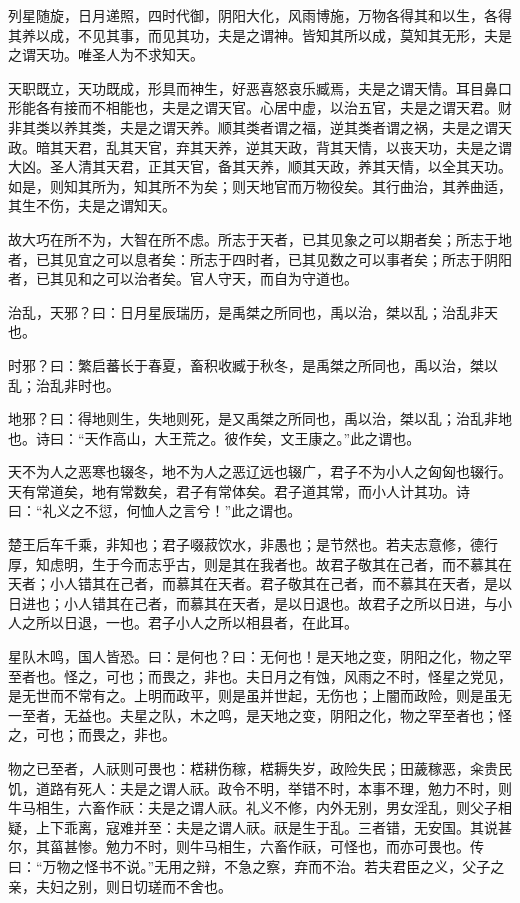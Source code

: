 \documentclass[]{article}
\begin{document}
列星随旋，日月递照，四时代御，阴阳大化，风雨博施，万物各得其和以生，各得其养以成，不见其事，而见其功，夫是之谓神。皆知其所以成，莫知其无形，夫是之谓天功。唯圣人为不求知天。

天职既立，天功既成，形具而神生，好恶喜怒哀乐臧焉，夫是之谓天情。耳目鼻口形能各有接而不相能也，夫是之谓天官。心居中虚，以治五官，夫是之谓天君。财非其类以养其类，夫是之谓天养。顺其类者谓之福，逆其类者谓之祸，夫是之谓天政。暗其天君，乱其天官，弃其天养，逆其天政，背其天情，以丧天功，夫是之谓大凶。圣人清其天君，正其天官，备其天养，顺其天政，养其天情，以全其天功。如是，则知其所为，知其所不为矣；则天地官而万物役矣。其行曲治，其养曲适，其生不伤，夫是之谓知天。

故大巧在所不为，大智在所不虑。所志于天者，已其见象之可以期者矣；所志于地者，已其见宜之可以息者矣：所志于四时者，已其见数之可以事者矣；所志于阴阳者，已其见和之可以治者矣。官人守天，而自为守道也。

治乱，天邪？曰：日月星辰瑞历，是禹桀之所同也，禹以治，桀以乱；治乱非天也。

时邪？曰：繁启蕃长于春夏，畜积收臧于秋冬，是禹桀之所同也，禹以治，桀以乱；治乱非时也。

地邪？曰：得地则生，失地则死，是又禹桀之所同也，禹以治，桀以乱；治乱非地也。诗曰：``天作高山，大王荒之。彼作矣，文王康之。''此之谓也。

天不为人之恶寒也辍冬，地不为人之恶辽远也辍广，君子不为小人之匈匈也辍行。天有常道矣，地有常数矣，君子有常体矣。君子道其常，而小人计其功。诗曰：``礼义之不愆，何恤人之言兮！''此之谓也。

楚王后车千乘，非知也；君子啜菽饮水，非愚也；是节然也。若夫志意修，德行厚，知虑明，生于今而志乎古，则是其在我者也。故君子敬其在己者，而不慕其在天者；小人错其在己者，而慕其在天者。君子敬其在己者，而不慕其在天者，是以日进也；小人错其在己者，而慕其在天者，是以日退也。故君子之所以日进，与小人之所以日退，一也。君子小人之所以相县者，在此耳。

星队木鸣，国人皆恐。曰：是何也？曰：无何也！是天地之变，阴阳之化，物之罕至者也。怪之，可也；而畏之，非也。夫日月之有蚀，风雨之不时，怪星之党见，是无世而不常有之。上明而政平，则是虽并世起，无伤也；上闇而政险，则是虽无一至者，无益也。夫星之队，木之鸣，是天地之变，阴阳之化，物之罕至者也；怪之，可也；而畏之，非也。

物之已至者，人祆则可畏也：楛耕伤稼，楛耨失岁，政险失民；田薉稼恶，籴贵民饥，道路有死人：夫是之谓人祆。政令不明，举错不时，本事不理，勉力不时，则牛马相生，六畜作祆：夫是之谓人祆。礼义不修，内外无别，男女淫乱，则父子相疑，上下乖离，寇难并至：夫是之谓人祆。祆是生于乱。三者错，无安国。其说甚尔，其菑甚惨。勉力不时，则牛马相生，六畜作祆，可怪也，而亦可畏也。传曰：``万物之怪书不说。''无用之辩，不急之察，弃而不治。若夫君臣之义，父子之亲，夫妇之别，则日切瑳而不舍也。
\end{document}
